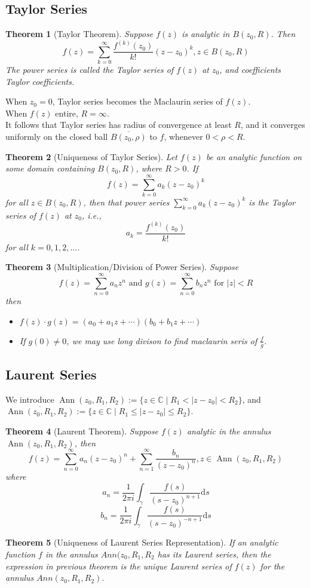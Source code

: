 \documentclass[12pt]{article}
\newcommand{\diff}{\mathrm{d}}
\newtheorem{theorem}{Theorem}[section]
\theoremstyle{definition}
\DeclareMathOperator{\Ann}{Ann}
\begin{document}
\subsection{Taylor Series}
\begin{theorem}[Taylor Theorem]
\normalfont Suppose $f(z)$ is analytic in $B(z_0, R)$. Then
\[
f(z)=\sum_{k=0}^\infty \frac{f^{(k)}(z_0)}{k!}(z-z_0)^k, z\in B(z_0, R)
\]
The power series is called the Taylor series of $f(z)$ at $z_0$, and coefficients Taylor coefficients.
\end{theorem}
When $z_0 = 0$, Taylor series becomes the Maclaurin series of $f(z)$.\\
When $f(z)$ entire, $R=\infty$.\\
It follows that Taylor series has radius of convergence at least $R$, and it converges uniformly on the closed ball $\overline{B(z_0, \rho)}$ to $f$, whenever $0<\rho<R$.
\begin{theorem}[Uniqueness of Taylor Series]
\normalfont Let $f(z)$ be an analytic function on some domain containing $B(z_0, R)$, where $R>0$. If
\[
f(z)=\sum_{k=0}^\infty a_k(z-z_0)^k
\]
for all $z\in B(z_0, R)$, then that power series $\sum_{k=0}^\infty a_k (z-z_0)^k$ is the Taylor series of $f(z)$ at $z_0$, i.e.,
\[
a_k = \frac{f^{(k)}(z_0)}{k!}
\]
for all $k = 0,1,2,\ldots$.
\end{theorem}
\begin{theorem}[Multiplication/Division of Power Series]
\normalfont Suppose 
\[
f(z)=\sum_{n=0}^\infty a_nz^n \text{ and } g(z)=\sum_{n=0}^\infty b_nz^n \text{ for }|z|<R
\]
then
\begin{itemize}
	\item $f(z)\cdot g(z) = (a_0 + a_1z + \cdots) (b_0 + b_1z + \cdots)$
	\item If $g(0) \neq 0$, we may use long divison to find maclaurin seris of $\frac{f}{g}$.
\end{itemize}
\end{theorem}
\subsection{Laurent Series}
We introduce $\Ann(z_0, R_1, R_2):=\{z\in \mathbb{C} \mid R_1 < |z-z_0| < R_2\}$, and 
$\overline{\Ann(z_0, R_1, R_2)}:= \{z\in \mathbb{C} \mid R_1 \leq |z-z_0| \leq R_2\}$.
\begin{theorem}[Laurent Theorem]
\normalfont Suppose $f(z)$ analytic in the annulus $\Ann(z_0, R_1, R_2)$, then
\[
f(z) = \sum_{n=0}^\infty a_n (z-z_0)^n + \sum_{n=1}^\infty \frac{b_n}{(z-z_0)^n}, z\in \Ann(z_0, R_1, R_2)
\]
where 
\[
a_n = \frac{1}{2\pi i}\int_{\gamma}\frac{f(s)}{(s-z_0)^{n+1}}\diff s
\]
\[
b_n = \frac{1}{2\pi i}\int_\gamma \frac{f(s)}{(s-z_0)^{-n+1}}\diff s
\]
\end{theorem}
\begin{theorem}[Uniqueness of Laurent Series Representation]
\normalfont If an analytic function $f$ in the annulus $Ann(z_0, R_1, R_2$ has its Laurent series, then the expression in previous theorem is the unique Laurent series of $f(z)$ for the annulus $Ann(z_0, R_1, R_2)$.
\end{theorem}
\end{document}

